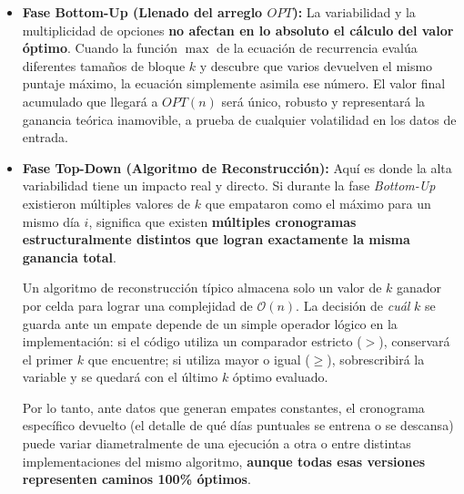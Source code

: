 \begin{itemize}
    \item \textbf{Fase Bottom-Up (Llenado del arreglo $OPT$):} La variabilidad y la multiplicidad de opciones \textbf{no afectan en lo absoluto el cálculo del valor óptimo}. Cuando la función $\max$ de la ecuación de recurrencia evalúa diferentes tamaños de bloque $k$ y descubre que varios devuelven el mismo puntaje máximo, la ecuación simplemente asimila ese número. El valor final acumulado que llegará a $OPT(n)$ será único, robusto y representará la ganancia teórica inamovible, a prueba de cualquier volatilidad en los datos de entrada.
    
    \item \textbf{Fase Top-Down (Algoritmo de Reconstrucción):} Aquí es donde la alta variabilidad tiene un impacto real y directo. Si durante la fase \textit{Bottom-Up} existieron múltiples valores de $k$ que empataron como el máximo para un mismo día $i$, significa que existen \textbf{múltiples cronogramas estructuralmente distintos que logran exactamente la misma ganancia total}. 
    
    Un algoritmo de reconstrucción típico almacena solo un valor de $k$ ganador por celda para lograr una complejidad de $\mathcal{O}(n)$. La decisión de \textit{cuál} $k$ se guarda ante un empate depende de un simple operador lógico en la implementación: si el código utiliza un comparador estricto ($>$), conservará el primer $k$ que encuentre; si utiliza mayor o igual ($\geq$), sobrescribirá la variable y se quedará con el último $k$ óptimo evaluado. 
    
    Por lo tanto, ante datos que generan empates constantes, el cronograma específico devuelto (el detalle de qué días puntuales se entrena o se descansa) puede variar diametralmente de una ejecución a otra o entre distintas implementaciones del mismo algoritmo, \textbf{aunque todas esas versiones representen caminos 100\% óptimos}.
\end{itemize}